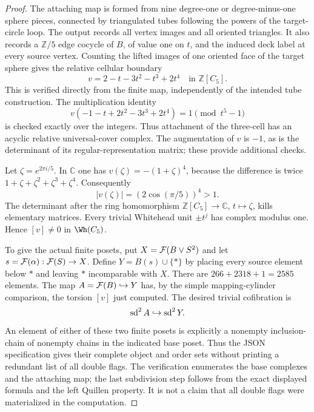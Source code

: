 \begin{proof}
The attaching map is formed from nine degree-one or degree-minus-one
sphere pieces, connected by triangulated tubes following the powers
of the target-circle loop. The output records all vertex images and
all oriented triangles. It also records a $\mathbb Z/5$ edge cocycle
of $B$, of value one on $t$, and the induced deck label at every
source vertex. Counting the lifted images of one oriented face of the
target sphere gives the relative cellular boundary
\[
 v=2-t-3t^2-t^3+2t^4\quad\text{in }\mathbb Z[C_5].
\]
This is verified directly from the finite map, independently of the
intended tube construction. The multiplication identity
\[
 v(-1-t+2t^2-3t^3+2t^4)=1\pmod {t^5-1}
\]
is checked exactly over the integers. Thus attachment of the
three-cell has an acyclic relative universal-cover complex.
The augmentation of $v$ is $-1$, as is the determinant of its
regular-representation matrix; these provide additional checks.

Let $\zeta=e^{2\pi i/5}$. In $\mathbb C$ one has
$v(\zeta)=-(1+\zeta)^4$, because the difference is twice
$1+\zeta+\zeta^2+\zeta^3+\zeta^4$. Consequently
\[
 |v(\zeta)|=(2\cos(\pi/5))^4>1.
\]
The determinant after the ring homomorphism
$\mathbb Z[C_5]\to\mathbb C$, $t\mapsto\zeta$, kills elementary
matrices. Every trivial Whitehead unit $\pm t^j$ has complex modulus
one. Hence $[v]\ne0$ in $\Wh(C_5)$.

To give the actual finite posets, put $X=\mathcal F(B\vee S^2)$ and let
$s=\mathcal F(\alpha):\mathcal F(S)\to X$. Define $Y=B(s)\cup\{\ast\}$ by
placing every source element below $\ast$ and leaving $\ast$
incomparable with $X$. There are $266+2318+1=2585$ elements.
The map $A=\mathcal F(B)\hookrightarrow Y$ has, by the simple
mapping-cylinder comparison, the torsion $[v]$ just computed.
The desired trivial cofibration is
\[
 \operatorname{sd}^2 A\hookrightarrow\operatorname{sd}^2Y.
\]
An element of either of these two finite posets is explicitly a
nonempty inclusion-chain of nonempty chains in the indicated base
poset. Thus the JSON specification gives their complete object and
order sets without printing a redundant list of all double flags.
The verification enumerates the base complexes and the attaching map;
the last subdivision step follows from the exact displayed formula
and the left Quillen property. It is not a claim that all double flags
were materialized in the computation.
\end{proof}

